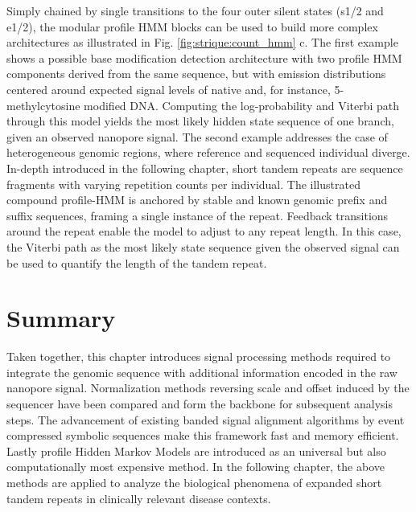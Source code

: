 Simply chained by single transitions to the four outer silent states (s1/2 and e1/2), the modular profile HMM blocks can be used to build more complex architectures as illustrated in Fig. \ref{fig:strique:count_hmm} c. 
The first example shows a possible base modification detection architecture with two profile HMM components derived from the same sequence, but with emission distributions centered around expected signal levels of native and, for instance, 5-methylcytosine modified DNA. Computing the log-probability and Viterbi path through this model yields the most likely hidden state sequence of one branch, given an observed nanopore signal.
The second example addresses the case of heterogeneous genomic regions, where reference and sequenced individual diverge. 
In-depth introduced in the following chapter, short tandem repeats are sequence fragments with varying repetition counts per individual. 
The illustrated compound profile-HMM is anchored by stable and known genomic prefix and suffix sequences, framing a single instance of the repeat. 
Feedback transitions around the repeat enable the model to adjust to any repeat length. In this case, the Viterbi path as the most likely state sequence given the observed signal can be used to quantify the length of the tandem repeat.




\section{Summary}
\label{sec:signal:summary}

Taken together, this chapter introduces signal processing methods required to integrate the genomic sequence with additional information encoded in the raw nanopore signal. Normalization methods reversing scale and offset induced by the sequencer have been compared and form the backbone for subsequent analysis steps. The advancement of existing banded signal alignment algorithms by event compressed symbolic sequences make this framework fast and memory efficient. 
Lastly profile Hidden Markov Models are introduced as an universal but also computationally most expensive method. 
In the following chapter, the above methods are applied to analyze the biological phenomena of expanded short tandem repeats in clinically relevant disease contexts.






